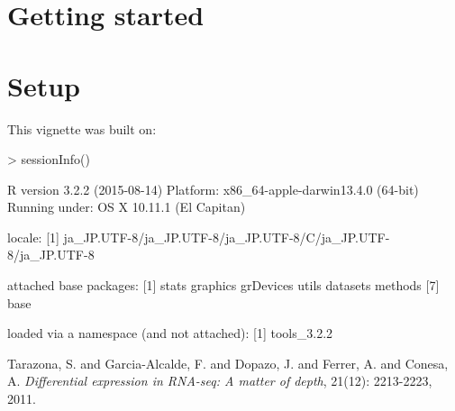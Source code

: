 \documentclass[11pt]{article}
\newcommand{\Rpackage}[1]{{\textit{#1}}}
\begin{document}
\section{Getting started}


\section{Setup}
This vignette was built on:
\begin{Schunk}
\begin{Sinput}
> sessionInfo()
\end{Sinput}
\begin{Soutput}
R version 3.2.2 (2015-08-14)
Platform: x86_64-apple-darwin13.4.0 (64-bit)
Running under: OS X 10.11.1 (El Capitan)

locale:
[1] ja_JP.UTF-8/ja_JP.UTF-8/ja_JP.UTF-8/C/ja_JP.UTF-8/ja_JP.UTF-8

attached base packages:
[1] stats     graphics  grDevices utils     datasets  methods  
[7] base     

loaded via a namespace (and not attached):
[1] tools_3.2.2
\end{Soutput}
\end{Schunk}

\newpage

\vspace{2cm}

\begin{thebibliography}{9}

Tarazona, S. and Garcia-Alcalde, F. and Dopazo, J. and Ferrer, A. and Conesa, A.
\newblock \emph {Differential expression in RNA-seq: A matter of depth}, 21(12): 2213-2223, 2011.

\end{thebibliography}
\end{document}
